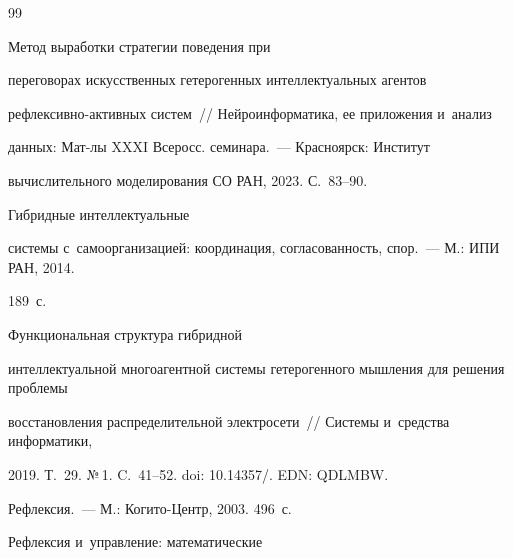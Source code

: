 {\small\frenchspacing


{%




\begin{thebibliography}{99}







   Метод выработки стратегии поведения при 


переговорах искусственных гетерогенных интеллектуальных агентов  


реф\-лек\-сив\-но-ак\-тив\-ных сис\-тем~/\!\!/ Нейроинформатика, ее приложения и~анализ 


данных: Мат-лы XXXI Всеросс. семинара.~--- Красноярск: Институт 


вычислительного моделирования СО РАН, 2023. С.~83--90.


  




   Гибридные интеллектуальные 


системы с~самоорганизацией: координация, согласованность, спор.~--- М.: ИПИ РАН, 2014. 


189~с.







   Функциональная структура гибридной 


интеллектуальной многоагентной системы гетерогенного мышления для решения проблемы 


восстановления распределительной электросети~/\!\!/ Системы и~средства информатики, 


2019. Т.~29. №\,1. C.~41--52.  doi: 10.14357\!/. EDN: QDLMBW.


  


  




   Рефлексия.~--- М.: Когито-Центр, 2003. 496~с.




   Рефлексия и~управление: математические 



\end{thebibliography}}}
